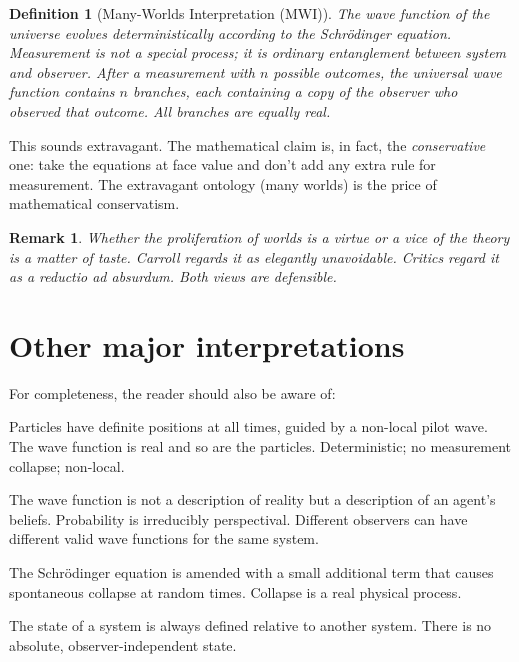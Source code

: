 \documentclass[11pt,a4paper]{book}
\theoremstyle{cleanrm}
\newtheorem{definition}{Definition}[chapter]
\newtheorem{remark}{Remark}[chapter]
\begin{document}
\begin{definition}[Many-Worlds Interpretation (MWI)]
The wave function of the universe evolves deterministically according
to the Schr\"odinger equation. Measurement is not a special process; it
is ordinary entanglement between system and observer. After a
measurement with $n$ possible outcomes, the universal wave function
contains $n$ branches, each containing a copy of the observer who
observed that outcome. All branches are equally real.
\end{definition}

This sounds extravagant. The mathematical claim is, in fact, the
\emph{conservative} one: take the equations at face value and don't
add any extra rule for measurement. The extravagant ontology
(many worlds) is the price of mathematical conservatism.

\begin{remark}
Whether the proliferation of worlds is a virtue or a vice of the
theory is a matter of taste. Carroll regards it as elegantly
unavoidable. Critics regard it as a reductio ad absurdum. Both views
are defensible.
\end{remark}

\section{Other major interpretations}

For completeness, the reader should also be aware of:

\begin{description}[leftmargin=1.5cm]
    \item[Bohmian mechanics (de Broglie--Bohm).] Particles have definite
    positions at all times, guided by a non-local pilot wave. The wave
    function is real and so are the particles. Deterministic; no
    measurement collapse; non-local.
    \item[QBism (Quantum Bayesianism).] The wave function is not a
    description of reality but a description of an agent's beliefs.
    Probability is irreducibly perspectival. Different observers can
    have different valid wave functions for the same system.
    \item[Objective collapse theories (GRW, CSL).] The Schr\"odinger
    equation is amended with a small additional term that causes
    spontaneous collapse at random times. Collapse is a real physical
    process.
    \item[Relational quantum mechanics (Rovelli).] The state of a
    system is always defined relative to another system. There is no
    absolute, observer-independent state.
\end{description}
\end{document}
